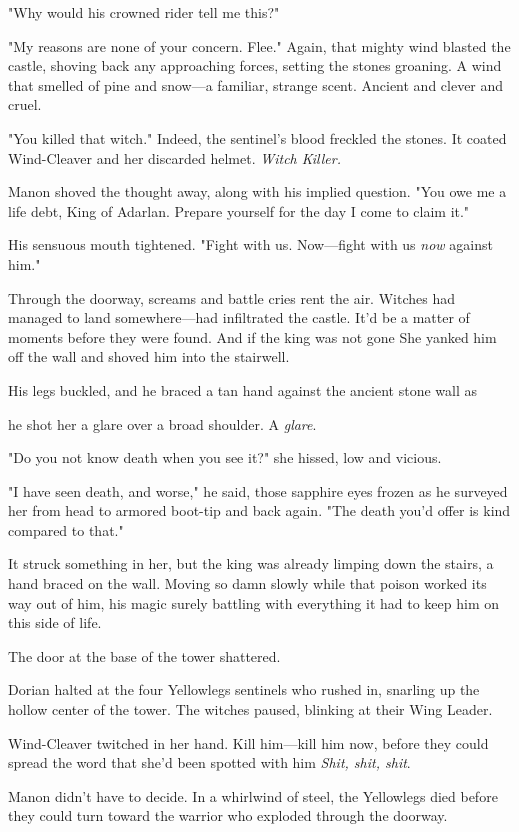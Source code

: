 "Why would his crowned rider tell me this?"

"My reasons are none of your concern. Flee." Again, that mighty wind blasted the castle, shoving back any approaching forces, setting the stones groaning. A wind that smelled of pine and snow---a familiar, strange scent. Ancient and clever and cruel.

"You killed that witch." Indeed, the sentinel's blood freckled the stones. It coated Wind-Cleaver and her discarded helmet. \emph{Witch Killer.}

Manon shoved the thought away, along with his implied question. "You owe me a life debt, King of Adarlan. Prepare yourself for the day I come to claim it."

His sensuous mouth tightened. "Fight with us. Now---fight with us
\emph{now} against him."

Through the doorway, screams and battle cries rent the air. Witches had managed to land somewhere---had infiltrated the castle. It'd be a matter of moments before they were found. And if the king was not gone 
She yanked him off the wall and shoved him into the stairwell.

His legs buckled, and he braced a tan hand against the ancient stone wall as

he shot her a glare over a broad shoulder. A \emph{glare}.

"Do you not know death when you see it?" she hissed, low and vicious.

"I have seen death, and worse," he said, those sapphire eyes frozen as he surveyed her from head to armored boot-tip and back again. "The death you'd offer is kind compared to that."

It struck something in her, but the king was already limping down the stairs, a hand braced on the wall. Moving so damn slowly while that poison worked its way out of him, his magic surely battling with everything it had to keep him on this side of life.

The door at the base of the tower shattered.

Dorian halted at the four Yellowlegs sentinels who rushed in, snarling up the hollow center of the tower. The witches paused, blinking at their Wing Leader.

Wind-Cleaver twitched in her hand. Kill him---kill him now, before they could spread the word that she'd been spotted with him 
\emph{Shit, shit, shit}.

Manon didn't have to decide. In a whirlwind of steel, the Yellowlegs died before they could turn toward the warrior who exploded through the doorway.


